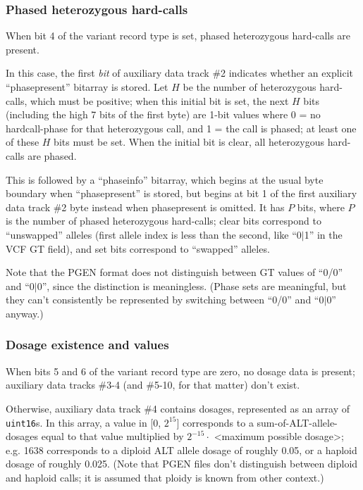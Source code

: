 \documentclass[8pt]{article}
\begin{document}
\subsubsection{Phased heterozygous hard-calls}

When bit 4 of the variant record type is set, phased heterozygous hard-calls
are present.

In this case, the first \textit{bit} of auxiliary data track \#2 indicates
whether an explicit ``phasepresent'' bitarray is stored.  Let $H$ be the number
of heterozygous hard-calls, which must be positive; when this initial bit is
set, the next $H$ bits
(including the high 7 bits of the first byte) are 1-bit values where 0 = no
hardcall-phase for that heterozygous call, and 1 = the call is phased; at
least one of these $H$ bits must be set.  When
the initial bit is clear, all heterozygous hard-calls are phased.

This is followed by a ``phaseinfo'' bitarray, which begins at the usual byte
boundary when ``phasepresent'' is stored, but begins at bit 1 of the first
auxiliary data track \#2 byte instead when phasepresent is omitted.  It has $P$
bits, where $P$ is the number of phased heterozygous hard-calls; clear bits
correspond to ``unswapped'' alleles (first allele index is less than the
second, like ``0$|$1'' in the VCF GT field), and set bits correspond to
``swapped'' alleles.

Note that the PGEN format does not distinguish between GT values of ``0/0'' and
``0$|$0'', since the distinction is meaningless.  (Phase sets are meaningful,
but they can't consistently be represented by switching between ``0/0'' and
``0$|$0'' anyway.)

\subsubsection{Dosage existence and values}

When bits 5 and 6 of the variant record type are zero, no dosage data is
present; auxiliary data tracks \#3-4 (and \#5-10, for that matter) don't exist.

Otherwise, auxiliary data track \#4 contains dosages, represented as an array
of \texttt{uint16}s.  In this array, a value in [0, $2^{15}$] corresponds to a
sum-of-ALT-allele-dosages equal to that value multiplied by $2^{-15}\cdot $
\textless maximum possible dosage\textgreater ; e.g. 1638 corresponds to a
diploid ALT allele dosage of roughly 0.05, or a haploid dosage of roughly
0.025.  (Note that PGEN files don't distinguish between diploid and haploid
calls; it is assumed that ploidy is known from other context.)
\end{document}
